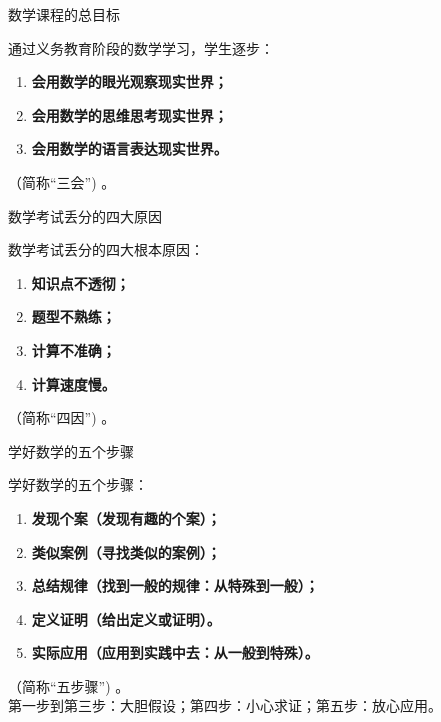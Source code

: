 \begin{frame}[t]{数学课程的总目标}
\begin{spacing}{1.5} %
{\fontsize{14}{18}\selectfont
通过义务教育阶段的数学学习，学生逐步：\\
\begin{enumerate}[label={\arabic*.}]
\item \textbf{会用数学的眼光观察现实世界；}\\
\item \textbf{会用数学的思维思考现实世界；}\\
\item \textbf{会用数学的语言表达现实世界。}\\
\end{enumerate}
（简称“三会”) 。\\
}
\end{spacing}
\end{frame}

\begin{frame}[t]{数学考试丢分的四大原因}
\begin{spacing}{1.5} %
{\fontsize{14}{18}\selectfont
数学考试丢分的四大根本原因：\\
\begin{enumerate}[label={\arabic*.}]
\item \textbf{知识点不透彻；}\\
\item \textbf{题型不熟练；}\\
\item \textbf{计算不准确；}\\
\item \textbf{计算速度慢。} \\
\end{enumerate}
（简称“四因”) 。
}
\end{spacing}
\end{frame}

\begin{frame}[t]{学好数学的五个步骤}
\begin{spacing}{1.2} %
{\fontsize{14}{18}\selectfont
学好数学的五个步骤：\\
\begin{enumerate}[label={\arabic*.}]
\item \textbf{发现个案（发现有趣的个案）；}\\
\item \textbf{类似案例（寻找类似的案例）；}\\
\item \textbf{总结规律（找到一般的规律：从特殊到一般）；}\\
\item \textbf{定义证明（给出定义或证明）。} \\
\item \textbf{实际应用（应用到实践中去：从一般到特殊）。} \\
\end{enumerate}
（简称“五步骤”) 。\\
\alert{第一步到第三步：大胆假设；第四步：小心求证；第五步：放心应用。}
}
\end{spacing}
\end{frame}